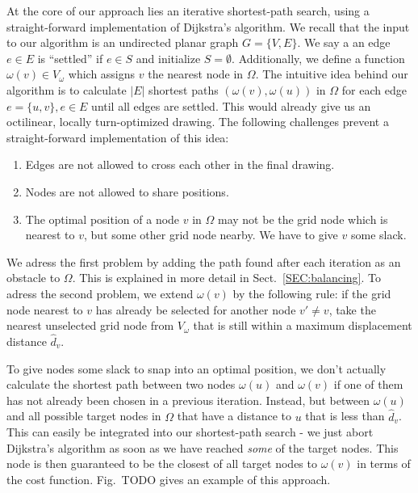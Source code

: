 \documentclass{sig-alternate-sigmod09}
\begin{document}
At the core of our approach lies an iterative shortest-path search, using a straight-forward implementation of Dijkstra's algorithm. We recall that the input to our algorithm is an undirected planar graph $G = \{V, E\}$. We say a an edge $e \in E$ is ``settled'' if $e \in S$ and initialize $S = \emptyset$. Additionally, we define a function $\omega(v) \in V_\omega$ which assigns $v$ the nearest node in $\Omega$.  The intuitive idea behind our algorithm is to calculate 
$|E|$ shortest paths $\left(\omega\left(v\right), \omega\left(u\right)\right)$ in $\Omega$ for each edge $e = \{u, v\}, e \in E$ until all edges are settled. This would already give us an octilinear, locally turn-optimized drawing. The following challenges prevent a straight-forward implementation of this idea:
\begin{enumerate}
\item Edges are not allowed to cross each other in the final drawing.
\item Nodes are not allowed to share positions.
\item The optimal position of a node $v$ in $\Omega$ may not be the grid node which is nearest to $v$, but some other grid node nearby. We have to give $v$ some slack.
\end{enumerate}

We adress the first problem by adding the path found after each iteration as an obstacle to $\Omega$. This is explained in more detail in Sect.~\ref{SEC:balancing}. To adress the second problem, we extend $\omega(v)$ by the following rule: if the grid node nearest to $v$ has already be selected for another node $v' \neq v$, take the nearest unselected grid node from $V_\omega$ that is still within a maximum displacement distance $\hat d_v$.


To give nodes some slack to snap into an optimal position, we don't actually calculate the shortest path between two nodes $\omega(u)$ and $\omega(v)$ if one of them has not already been chosen in a previous iteration. Instead, but between $\omega(u)$ and all possible target nodes in $\Omega$ that have a distance to $u$ that is less than $\hat d_v$. This can easily be integrated into our shortest-path search - we just abort Dijkstra's algorithm as soon as we have reached \emph{some} of the target nodes. This node is then guaranteed to be the closest of all target nodes to $\omega(v)$ in terms of the cost function. Fig.~TODO gives an example of this approach.
\end{document}
